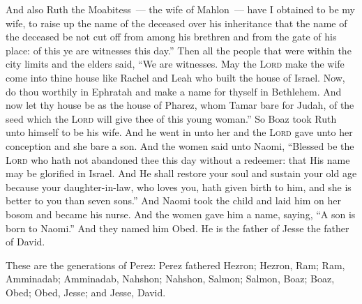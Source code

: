 \begin{inparaenum}
   And also Ruth the Moabitess~--- the wife of Mahlon~--- have I obtained to be my wife, to raise up the name of the deceased over his inheritance that the name of the deceased be not cut off from among his brethren and from the gate of his place: of this ye are witnesses this day.''%
   Then all the people that were within the city limits and the elders said, ``We are witnesses. May the \textsc{Lord} make the wife come into thine house like Rachel and Leah who built the house of Israel. Now, do thou worthily in Ephratah and make a name for thyself in Bethlehem.%
   And now let thy house be as the house of Pharez, whom Tamar bare for Judah, of the seed which the \textsc{Lord} will give thee of this young woman.''%
   So Boaz took Ruth unto himself to be his wife. And he went in unto her and the \textsc{Lord} gave unto her conception and she bare a son.%
   And the women said unto Naomi, ``Blessed be the \textsc{Lord} who hath not abandoned thee this day without a redeemer: that His name may be glorified in Israel.%
   And He shall restore your soul and sustain your old age because your daughter-in-law, who loves you, hath given birth to him, and she is better to you than seven sons.''%
   And Naomi took the child and laid him on her bosom and became his nurse.%
   And the women gave him a name, saying, ``A son is born to Naomi.'' And they named him Obed. He is the father of Jesse the father of David.%
  
   These are the generations of Perez: Perez fathered Hezron;%
   Hezron, Ram; Ram, Amminadab;%
   Amminadab, Nahshon; Nahshon, Salmon;%
   Salmon, Boaz; Boaz, Obed;%
   Obed, Jesse; and Jesse, David.%
\end{inparaenum}
